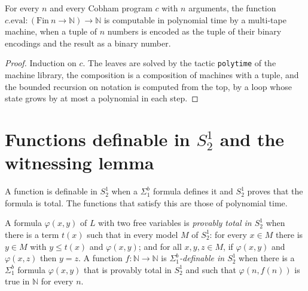 \begin{theorem}
  \label{thm:arithmetic-cob-polytime}
  \leanok
  For every $n$ and every Cobham program $c$ with $n$ arguments, the function $c.\mathrm{eval} :
  (\mathrm{Fin}\ n \to \mathbb{N}) \to \mathbb{N}$ is computable in polynomial time by a multi-tape
  machine, when a tuple of $n$ numbers is encoded as the tuple of their binary encodings and the
  result as a binary number.
\end{theorem}

\begin{proof}
  \leanok
  Induction on $c$. The leaves are solved by the tactic \texttt{polytime} of the machine library, the
  composition is a composition of machines with a tuple, and the bounded recursion on notation is
  computed from the top, by a loop whose state grows by at most a polynomial in each step.
\end{proof}

\section{Functions definable in $S^1_2$ and the witnessing lemma}
\label{sec:arithmetic-witness}

A function is definable in $S^1_2$ when a $\Sigma^b_1$ formula defines it and $S^1_2$ proves that the
formula is total. The functions that satisfy this are those of polynomial time.

\begin{definition}
  \label{def:arithmetic-definable}
  \leanok
  A formula $\varphi(x, y)$ of $L$ with two free variables is \emph{provably total in $S^1_2$} when
  there is a term $t(x)$ such that in every model $M$ of $S^1_2$: for every $x \in M$ there is $y \in
  M$ with $y \le t(x)$ and $\varphi(x, y)$; and for all $x, y, z \in M$, if $\varphi(x, y)$ and
  $\varphi(x, z)$ then $y = z$. A function $f : \mathbb{N} \to \mathbb{N}$ is \emph{$\Sigma^b_1$-definable
  in $S^1_2$} when there is a $\Sigma^b_1$ formula $\varphi(x, y)$ that is provably total in
  $S^1_2$ and such that $\varphi(n, f(n))$ is true in $\mathbb{N}$ for every $n$.
\end{definition}


